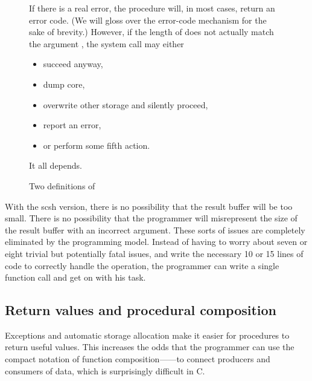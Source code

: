 \begin{figure}
\begin{boxedminipage}{\linewidth}
If there is a real error,
the procedure will, in most cases, return an error code.
	(We will gloss over the error-code mechanism for the sake of
	brevity.)
However, if the length of  does not actually match the argument
,
the system call may either%
\begin{itemize}%
\item succeed anyway,
\item dump core,
\item overwrite other storage and silently proceed,
\item report an error, 
\item or perform some fifth action.
\end{itemize}%
It all depends.
\end{boxedminipage}

\caption{Two definitions of \protect{}}
\label{fig:symlink}
\end{figure}
%
With the scsh version, there is no possibility that the result buffer will be
too small.
There is no possibility that the programmer will misrepresent the
size of the result buffer with an incorrect  argument.
These sorts of issues are completely eliminated by the {\Scheme} programming
model.
Instead of having to worry about seven or eight trivial but potentially
fatal issues, and write the necessary 10 or 15 lines of code to correctly
handle the operation, the programmer can write a single function call and
get on with his task.

\subsection{Return values and procedural composition}
Exceptions and automatic storage allocation make it easier for
procedures to return useful values.
This increases the odds that the programmer can use the compact notation
of function composition------to connect producers and consumers
of data, which is surprisingly difficult in C.

